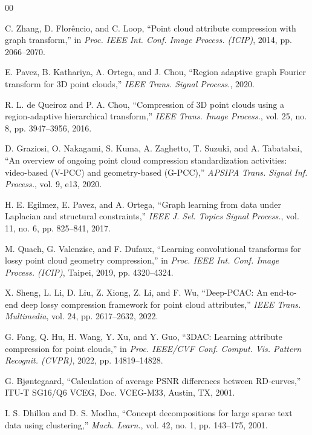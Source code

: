 \documentclass[conference]{IEEEtran}
\begin{document}
\begin{thebibliography}{00}

C. Zhang, D. Florêncio, and C. Loop, ``Point cloud attribute compression with graph transform,''
in \emph{Proc. IEEE Int. Conf. Image Process. (ICIP)}, 2014, pp. 2066--2070.

E. Pavez, B. Kathariya, A. Ortega, and J. Chou, ``Region adaptive graph Fourier transform for
3D point clouds,'' \emph{IEEE Trans. Signal Process.}, 2020.

R. L. de Queiroz and P. A. Chou, ``Compression of 3D point clouds using a region-adaptive
hierarchical transform,'' \emph{IEEE Trans. Image Process.}, vol. 25, no. 8, pp. 3947--3956,
2016.

D. Graziosi, O. Nakagami, S. Kuma, A. Zaghetto, T. Suzuki, and A. Tabatabai, ``An overview of
ongoing point cloud compression standardization activities: video-based (V-PCC) and
geometry-based (G-PCC),'' \emph{APSIPA Trans. Signal Inf. Process.}, vol. 9, e13, 2020.

H. E. Egilmez, E. Pavez, and A. Ortega, ``Graph learning from data under Laplacian and
structural constraints,'' \emph{IEEE J. Sel. Topics Signal Process.}, vol. 11, no. 6, pp.
825--841, 2017.

M. Quach, G. Valenzise, and F. Dufaux, ``Learning convolutional transforms for lossy point
cloud geometry compression,'' in \emph{Proc. IEEE Int. Conf. Image Process. (ICIP)}, Taipei,
2019, pp. 4320--4324.

X. Sheng, L. Li, D. Liu, Z. Xiong, Z. Li, and F. Wu, ``Deep-PCAC: An end-to-end deep lossy
compression framework for point cloud attributes,'' \emph{IEEE Trans. Multimedia}, vol. 24, pp.
2617--2632, 2022.

G. Fang, Q. Hu, H. Wang, Y. Xu, and Y. Guo, ``3DAC: Learning attribute compression for point
clouds,'' in \emph{Proc. IEEE/CVF Conf. Comput. Vis. Pattern Recognit. (CVPR)}, 2022, pp.
14819--14828.

G. Bj\o ntegaard, ``Calculation of average PSNR differences between RD-curves,'' ITU-T
SG16/Q6 VCEG, Doc. VCEG-M33, Austin, TX, 2001.

I. S. Dhillon and D. S. Modha, ``Concept decompositions for large sparse text data using
clustering,'' \emph{Mach. Learn.}, vol. 42, no. 1, pp. 143--175, 2001.


\end{thebibliography}
\end{document}
